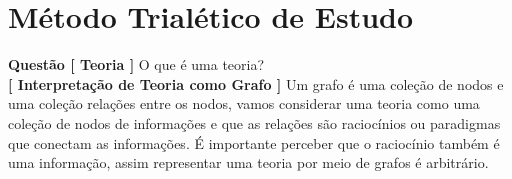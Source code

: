 
\section{Método Trialético de Estudo}

\hspace{\baselineskip}

\textbf{Questão [ Teoria ]} O que é uma teoria?\\


\textbf{[ Interpretação de Teoria como Grafo ]} Um grafo é uma coleção de nodos e uma coleção relações entre os nodos, vamos considerar uma teoria como uma coleção de nodos de informações e que as relações são raciocínios ou paradigmas que conectam as informações. É importante perceber que o raciocínio também é uma informação, assim representar uma teoria por meio de grafos é arbitrário.\\

